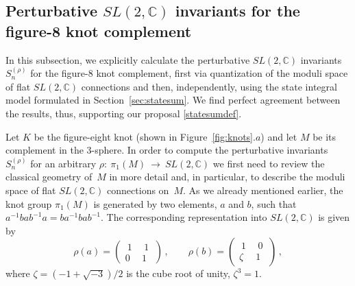 \documentclass[hyper]{JHEP3}
\newcommand{\C}{{\mathbb{C}}}
\newcommand\be{\begin{equation}}
\newcommand\ee{\end{equation}}
\begin{document}
\subsection{Perturbative $SL(2,\C)$ invariants for the figure-8 knot complement}
\label{sec:figeight}

In this subsection, we explicitly calculate the perturbative $SL(2,\C)$ invariants
$S_n^{(\rho)}$ for the figure-8 knot complement, first via quantization
of the moduli space of flat $SL(2,\C)$ connections and then, independently,
using the state integral model formulated in Section~\ref{sec:statesum}.
We find perfect agreement between the results, thus, supporting our proposal \eqref{statesumdef}.

Let $K$ be the figure-eight knot (shown in Figure~\ref{fig:knots}.$a$)
and let $M$ be its complement in the 3-sphere.
In order to compute the perturbative invariants~$S_n^{(\rho)}$
for an arbitrary $\rho:~\pi_1 (M)~\to~SL(2,\C)$ we first need to review the classical geometry of~$M$
in more detail and, in particular, to describe the moduli space of flat $SL(2,\C)$ connections on~$M$.
As we already mentioned earlier, 
the knot group $\pi_1 (M)$ is generated by two elements, $a$ and $b$,
such that $a^{-1} b a b^{-1} a = ba^{-1} ba b^{-1}$.
The corresponding representation into $SL(2,\C)$ is given by
\be
\rho (a) = \begin{pmatrix}  ~1~ & ~1~ \\ 0 & 1  \end{pmatrix}\,, \qquad
\rho (b) = \begin{pmatrix}  ~1~ & ~0~ \\ \zeta & 1  \end{pmatrix}\,,
\ee
where $\zeta = (-1 + \sqrt{-3})/2$ is the cube root of unity, $\zeta^3 = 1$.
\end{document}
